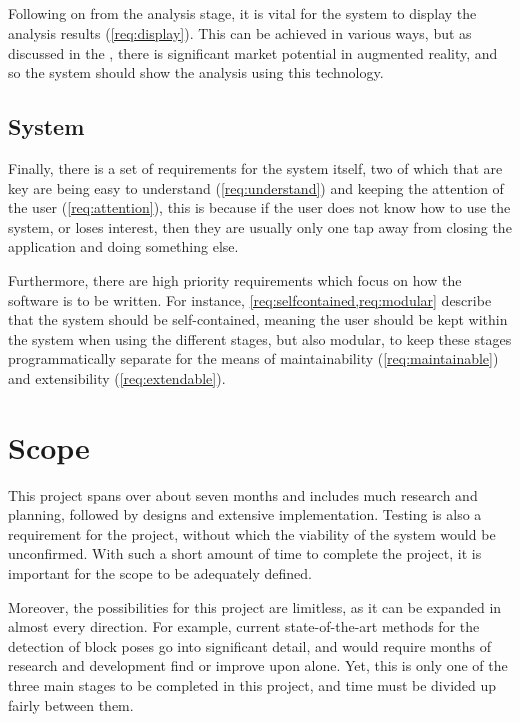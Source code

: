 \subsection{\display}

Following on from the analysis stage, it is vital for the system to display the analysis results (\cref{req:display}). This can be achieved in various ways, but as discussed in the , there is significant market potential in augmented reality, and so the system should show the analysis using this technology.

\subsection{System}

Finally, there is a set of requirements for the system itself, two of which that are key are being easy to understand (\cref{req:understand}) and keeping the attention of the user (\cref{req:attention}), this is because if the user does not know how to use the system, or loses interest, then they are usually only one tap away from closing the application and doing something else.

Furthermore, there are high priority requirements which focus on how the software is to be written. For instance, \cref{req:selfcontained,req:modular} describe that the system should be self-contained, meaning the user should be kept within the system when using the different stages, but also modular, to keep these stages programmatically separate for the means of maintainability (\cref{req:maintainable}) and extensibility (\cref{req:extendable}).

\section{Scope}\label{sec:scope}

This project spans over about seven months and includes much research and planning, followed by designs and extensive implementation. Testing is also a requirement for the project, without which the viability of the system would be unconfirmed. With such a short amount of time to complete the project, it is important for the scope to be adequately defined.

Moreover, the possibilities for this project are limitless, as it can be expanded in almost every direction. For example, current state-of-the-art methods for the detection of block poses go into significant detail, and would require months of research and development find or improve upon alone. Yet, this is only one of the three main stages to be completed in this project, and time must be divided up fairly between them.

